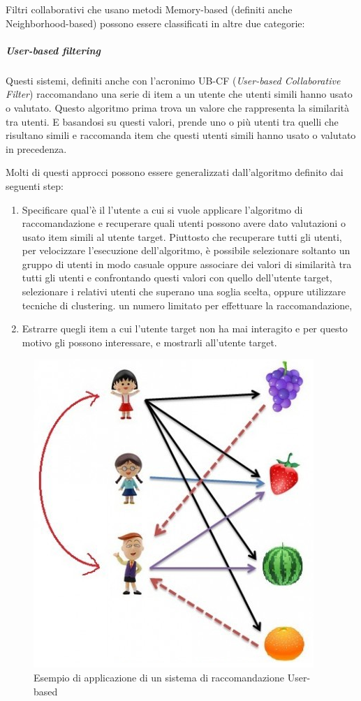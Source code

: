 Filtri collaborativi che usano metodi Memory-based (definiti anche Neighborhood-based) possono essere classificati in altre due
categorie:


\subparagraph{User-based filtering} \hfill \break
Questi sistemi, definiti anche con l'acronimo UB-CF (\textit{User-based Collaborative Filter}) raccomandano una serie di item a 
un utente che utenti simili hanno usato o valutato. Questo algoritmo prima trova un valore che rappresenta la similarità tra utenti. 
E basandosi su questi valori, prende uno o più utenti tra quelli che risultano simili e raccomanda item che questi utenti simili 
hanno usato o valutato in precedenza.

Molti di questi approcci possono essere generalizzati dall'algoritmo definito dai seguenti step:
\begin{enumerate}
	\item Specificare qual'è il l'utente a cui si vuole applicare l'algoritmo di raccomandazione e recuperare quali utenti possono 
	avere dato valutazioni o usato item simili al utente target. Piuttosto che recuperare tutti gli utenti, per velocizzare l'esecuzione
	dell'algoritmo, è possibile selezionare soltanto un gruppo di utenti in modo casuale oppure associare dei valori di similarità tra 
	tutti gli utenti e confrontando questi valori con quello dell'utente target, selezionare i relativi utenti che superano una soglia
	scelta, oppure utilizzare tecniche di clustering. 
	un numero limitato per effettuare la raccomandazione, 
	\item Estrarre quegli item a cui l'utente target non ha mai interagito e per questo motivo gli possono interessare, e mostrarli 
	all'utente target.
\end{enumerate}

\begin{figure}[ht!]
	\centering
	\includegraphics[scale=0.5]{images/UB_CF_ex.PNG}
	\caption{Esempio di applicazione di un sistema di raccomandazione User-based}
	\label{fig:UB_CF}
\end{figure}

